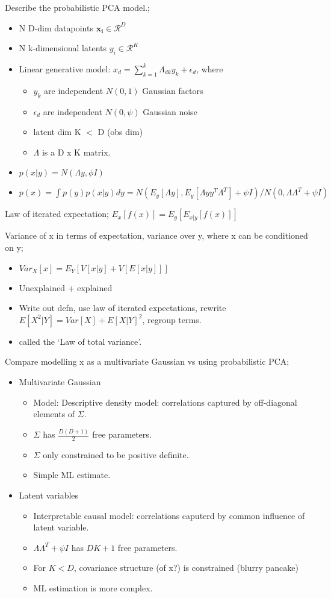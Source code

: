 \documentclass{article}
\begin{document}
Describe the probabilistic PCA model.; \begin{itemize} \item N D-dim datapoints $\mathbf{x_i} \in \mathcal{R}^D$ \item N k-dimensional latents $y_i \in \mathcal{R}^K$ \item Linear generative model: $x_d = \sum_{k=1}^k \Lambda_{dk}y_k + \epsilon_d$, where \begin{itemize} \item $y_k$ are independent $N(0,1)$ Gaussian factors \item $\epsilon_d$ are independent $N(0,\psi)$ Gaussian noise \item latent dim K $<$ D (obs dim) \item $\Lambda$ is a D x K matrix.  \end{itemize} \item $p(x|y) = N(\Lambda y,\phi I)$ \item $p(x) = \int p(y)p(x|y)dy = N(E_y[\Lambda y], E_y[\Lambda y y^T\Lambda^T]+\psi I)/N(0,\Lambda\Lambda^T+\psi I)$ \end{itemize}

Law of iterated expectation; $E_x[f(x)] = E_y[E_{x|y}[f(x)]]$

Variance of x in terms of expectation, variance over y, where x can be conditioned on y; \begin{itemize} \item $Var_X[x] = E_Y[V[x|y] + V[E[x|y]]]$ \item Unexplained + explained \item Write out defn, use law of iterated expectations, rewrite $E[X^2|Y]=Var[X]+E[X|Y]^2$, regroup terms. \item called the `Law of total variance'. \end{itemize} 

Compare modelling x as a multivariate Gaussian vs using probabilistic PCA; \begin{itemize}\item Multivariate Gaussian \begin{itemize} \item Model: Descriptive density model: correlations captured by off-diagonal elements of $\Sigma$.  \item $\Sigma$ has $\frac{D(D+1)}{2}$ free parameters.  \item $\Sigma$ only constrained to be positive definite.  \item Simple ML estimate.  \end{itemize} \item Latent variables \begin{itemize} \item Interpretable causal model: correlations caputerd by common influence of latent variable.  \item $\Lambda\Lambda^T +\psi I$ has $DK+1$ free parameters.  \item For $K < D$, covariance structure (of x?) is constrained (blurry pancake) \item ML estimation is more complex.  \end{itemize} \end{itemize}
\end{document}
